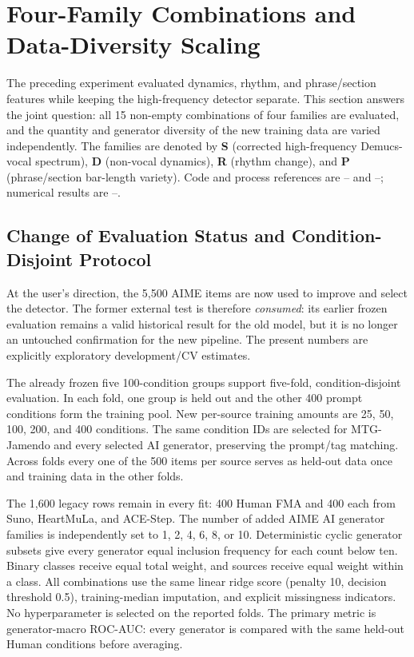 \section{Four-Family Combinations and Data-Diversity Scaling}
\label{sec:four-family-diversity}

The preceding experiment evaluated dynamics, rhythm, and phrase/section
features while keeping the high-frequency detector separate.  This section
answers the joint question: all 15 non-empty combinations of four families are
evaluated, and the quantity and generator diversity of the new training data
are varied independently.  The families are denoted by \textbf{S} (corrected
high-frequency Demucs-vocal spectrum), \textbf{D} (non-vocal dynamics),
\textbf{R} (rhythm change), and \textbf{P} (phrase/section bar-length variety).
Code and process references are -- and
--; numerical results are --.

\subsection{Change of Evaluation Status and Condition-Disjoint Protocol}

At the user's direction, the 5,500 AIME items are now used to improve and
select the detector.  The former external test is therefore \emph{consumed}:
its earlier frozen evaluation remains a valid historical result for the old
model, but it is no longer an untouched confirmation for the new pipeline.
The present numbers are explicitly exploratory development/CV estimates.

The already frozen five 100-condition groups support five-fold,
condition-disjoint evaluation.  In each fold, one group is held out and the
other 400 prompt conditions form the training pool.  New per-source training
amounts are 25, 50, 100, 200, and 400 conditions.  The same condition IDs are
selected for MTG-Jamendo and every selected AI generator, preserving the
prompt/tag matching.  Across folds every one of the 500 items per source serves
as held-out data once and training data in the other folds.

The 1,600 legacy rows remain in every fit: 400 Human FMA and 400 each from
Suno, HeartMuLa, and ACE-Step.  The number of added AIME AI generator families
is independently set to 1, 2, 4, 6, 8, or 10.  Deterministic cyclic generator
subsets give every generator equal inclusion frequency for each count below
ten.  Binary classes receive equal total weight, and sources receive equal
weight within a class.  All combinations use the same linear ridge score
(penalty 10, decision threshold 0.5), training-median imputation, and explicit
missingness indicators.  No hyperparameter is selected on the reported folds.
The primary metric is generator-macro ROC-AUC: every generator is compared with
the same held-out Human conditions before averaging.


